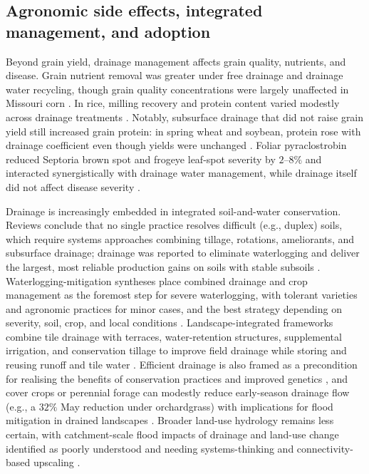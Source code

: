 \documentclass[11pt]{article}
\begin{document}
\subsection{Agronomic side effects, integrated management, and adoption}

Beyond grain yield, drainage management affects grain quality, nutrients, and disease. Grain nutrient removal was greater under free drainage and drainage water recycling, though grain quality concentrations were largely unaffected in Missouri corn \parencite{Kaur2021}. In rice, milling recovery and protein content varied modestly across drainage treatments \parencite{DarziNaftchali2017b}. Notably, subsurface drainage that did not raise grain yield still increased grain protein: in spring wheat and soybean, protein rose with drainage coefficient even though yields were unchanged \parencite{Wiersma2010}. Foliar pyraclostrobin reduced Septoria brown spot and frogeye leaf-spot severity by \(2\textrm{--}8\%\) and interacted synergistically with drainage water management, while drainage itself did not affect disease severity \parencite{Nelson2011b}.

Drainage is increasingly embedded in integrated soil-and-water conservation. Reviews conclude that no single practice resolves difficult (e.g., duplex) soils, which require systems approaches combining tillage, rotations, ameliorants, and subsurface drainage; drainage was reported to eliminate waterlogging and deliver the largest, most reliable production gains on soils with stable subsoils \parencite{GARDNER1992}. Waterlogging-mitigation syntheses place combined drainage and crop management as the foremost step for severe waterlogging, with tolerant varieties and agronomic practices for minor cases, and the best strategy depending on severity, soil, crop, and local conditions \parencite{Manik2019}. Landscape-integrated frameworks combine tile drainage with terraces, water-retention structures, supplemental irrigation, and conservation tillage to improve field drainage while storing and reusing runoff and tile water \parencite{Li2021b}. Efficient drainage is also framed as a precondition for realising the benefits of conservation practices and improved genetics \parencite{Rui2024}, and cover crops or perennial forage can modestly reduce early-season drainage flow (e.g., a \(32\%\) May reduction under orchardgrass) with implications for flood mitigation in drained landscapes \parencite{Goeken2015,Daigh2014}. Broader land-use hydrology remains less certain, with catchment-scale flood impacts of drainage and land-use change identified as poorly understood and needing systems-thinking and connectivity-based upscaling \parencite{Rogger2017}.
\end{document}
